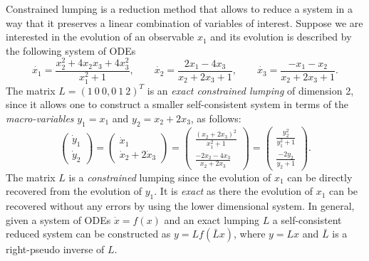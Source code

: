 Constrained lumping is a reduction method that allows to reduce a system in a way that it preserves a linear combination of variables of interest. 
Suppose we are interested in the evolution of an observable $x_1$ and its evolution is described by the following system of ODEs  
    \begin{equation} \label{eq:example1}
        \dot{x_{1}} = \frac {x_{2}^{2} +4x_{2}x_{3} +4x_{3}^{2}}{x_{1}^{2} + 1 },\qquad
        \dot{x_{2}} = \frac{2x_{1}-4x_{3}}{x_{2}+2x_{3} + 1},\qquad
        \dot{x_{3}} = \frac{-x_{1}-x_{2}}{x_{2}+2x_{3}+1}.
    \end{equation}
    The matrix $L = (1 \ 0\ 0, 0\ 1\  2)^{T}$ is an \textit{exact constrained lumping} of dimension 2, since it allows one to construct a smaller self-consistent system in terms of the \textit{macro-variables} $y_1= x_1$ and $ y_2 = x_2 + 2x_3$, as follows:
\begin{equation*}
        \begin{pmatrix}
            \dot{y}_{1} \\
            \dot{y}_{2}
        \end{pmatrix}
        =
        \begin{pmatrix}
            \dot{x}_{1} \\
            \dot{x}_{2} +2 \dot{x}_{3}
        \end{pmatrix}
        =
        \begin{pmatrix}
            \frac{(x_{2}+2x_{3})^{2}}{x_{1}^{2}+1} \\
            \frac{-2x_{2}-4x_{3}}{x_{2}+2x_{3}}
        \end{pmatrix}
        =
        \begin{pmatrix}
            \frac{y_{2}^{2}}{y_{1}^{2}+1} \\
            \frac{-2y_{2}}{y_{2}+1}
        \end{pmatrix}.
\end{equation*}
The matrix $L$ is a \textit{constrained} lumping since the evolution of $x_1$ can be directly recovered from the evolution of $y_1$.
It is \textit{exact} as there the evolution of $x_1$ can be recovered without any errors by using the lower dimensional system.
In general, given a system of ODEs $\dot{x} = f(x)$  and an exact lumping $L$ a self-consistent reduced system can be constructed as 
$y= L f(\bar{L}x)$, where $y = Lx$ and $\bar{L}$ is a right-pseudo inverse of $L$.

